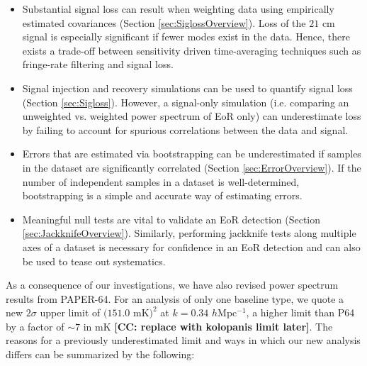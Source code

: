 \documentclass[preprint2,numberedappendix,tighten]{aastex6}  %
\newcommand{\cc}[1]{{\color{purple} \textbf{[CC: #1]}}}
\begin{document}
\begin{itemize}
\item Substantial signal loss can result when weighting data using empirically estimated covariances (Section 
\ref{sec:SiglossOverview}). Loss of the $21$ cm signal is especially significant if fewer modes
exist in the data. Hence, there exists a trade-off between sensitivity driven 
time-averaging techniques such as fringe-rate filtering and signal loss. 
\item Signal injection and recovery simulations can be used to quantify signal loss (Section \ref{sec:Sigloss}). However, a 
signal-only simulation (i.e. comparing an unweighted vs. weighted power spectrum of EoR only) can underestimate loss by 
failing to account for spurious correlations between the data and signal.
\item Errors that are estimated via bootstrapping can be underestimated if samples in the dataset are significantly correlated 
(Section \ref{sec:ErrorOverview}). If the number of independent samples in a dataset is well-determined, bootstrapping is a 
simple and accurate way of estimating errors.
\item Meaningful null tests are vital to validate an EoR detection (Section \ref{sec:JackknifeOverview}). Similarly, performing 
jackknife tests along multiple axes of a dataset is necessary for confidence in an EoR detection and can also be used to tease 
out systematics.
\end{itemize}

As a consequence of our investigations, we have also revised power spectrum results from PAPER-64. For an analysis of only 
one baseline type, we quote a new $2\sigma$ upper limit of $(151.0$ mK$)^{2}$ at $k=0.34$ $h$Mpc$^{-1}$, a higher limit than 
P64 by a factor of $\sim7$ in mK \cc{replace with kolopanis limit later}. The reasons for a previously underestimated limit and 
ways in which our new analysis differs can be summarized by the following:
\end{document}
